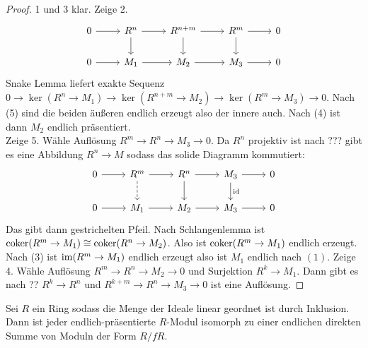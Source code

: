 \begin{proof}
    1 und 3 klar.
    Zeige 2. $$%
\begin{tikzcd}
0 \arrow[r] & R^n \arrow[d] \arrow[r] & R^{n+m} \arrow[d] \arrow[r] & R^m \arrow[d] \arrow[r] & 0 \\
0 \arrow[r] & M_1 \arrow[r]           & M_2 \arrow[r]               & M_3 \arrow[r]           & 0
\end{tikzcd}$$
Snake Lemma liefert exakte Sequenz \(0\to \ker(R^n\to M_1)\to \ker(R^{n+m}\to M_2)\to \ker(R^m\to M_3)\to 0\).
Nach (5) sind die beiden äußeren endlich erzeugt also der innere auch. Nach (4) ist dann \(M_2\) endlich präsentiert.\\
Zeige 5. Wähle Auflösung \(R^m\to R^n\to M_3\to 0\). Da \(R^n\) projektiv ist nach ??? gibt es eine Abbildung \(R^n\to M\) sodass 
das solide Diagramm kommutiert:
\[%
\begin{tikzcd}
0 \arrow[r] & R^m \arrow[d, dashed] \arrow[r] & R^{n} \arrow[d] \arrow[r] & M_3 \arrow[d, "\id"] \arrow[r] & 0 \\
0 \arrow[r] & M_1 \arrow[r]                   & M_2 \arrow[r]             & M_3 \arrow[r]                  & 0
\end{tikzcd}\] Das gibt dann gestrichelten Pfeil. Nach Schlangenlemma ist \(\operatorname{coker}(R^m\to M_1)\cong \operatorname{coker}(R^n\to M_2)\). 
Also ist \(\operatorname{coker}(R^m\to M_1)\)
 endlich erzeugt. Nach (3) ist \(\operatorname{im}(R^m\to M_1)\) endlich erzeugt also ist \(M_1\) endlich nach \((1)\).
Zeige 4. Wähle Auflösung \(R^m\to R^n\to M_2\to 0\) und Surjektion \(R^k\to M_1\). Dann gibt es nach ?? \(R^k\to R^n\) und \(R^{k+m}\to R^n\to M_3\to 0\) ist eine Auflösung.
\end{proof}
\begin{Lemma}\label{Lem:EndlPräsDirSum}
    Sei \(R\) ein Ring sodass die Menge der Ideale linear geordnet ist durch Inklusion. Dann ist jeder endlich-präsentierte \(R\)-Modul isomorph zu einer endlichen direkten Summe von Moduln der Form \(R/fR\).
\end{Lemma}

